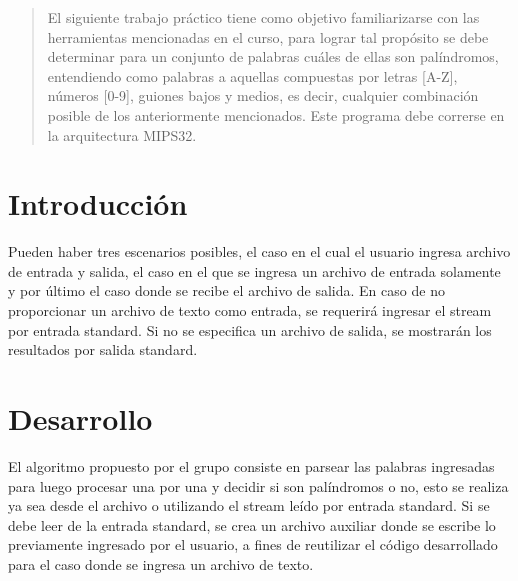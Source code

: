 \documentclass[a4paper]{article}
\begin{document}

\fecha{\today}


\maketitle

\begin{abstract}
El siguiente trabajo práctico tiene como objetivo familiarizarse con las herramientas mencionadas en el curso, para lograr tal propósito se debe determinar para un conjunto de palabras cuáles de ellas son palíndromos, entendiendo como palabras a aquellas compuestas por letras [A-Z], números [0-9], guiones bajos y medios, es decir, cualquier combinación posible de los anteriormente mencionados. Este programa debe correrse en la arquitectura MIPS32.
\end{abstract}


\section{Introducción}
Pueden haber tres escenarios posibles, el caso en el cual el usuario ingresa archivo de entrada y salida, el caso en el que se ingresa un archivo de entrada solamente y por último el caso donde se recibe el archivo de salida. En caso de no proporcionar un archivo de texto como entrada, se requerirá ingresar el stream por entrada standard. Si no se especifica un archivo de salida, se mostrarán los resultados por salida standard. 


\section{Desarrollo}

El algoritmo propuesto por el grupo consiste en parsear las palabras ingresadas para luego procesar una por una y decidir si son palíndromos o no, esto se realiza ya sea desde el archivo o utilizando el stream leído por entrada standard. Si se debe leer de la entrada standard, se crea un archivo auxiliar donde se escribe lo previamente ingresado por el usuario, a fines de reutilizar el código desarrollado para el caso donde se ingresa un archivo de texto.
\end{document}
